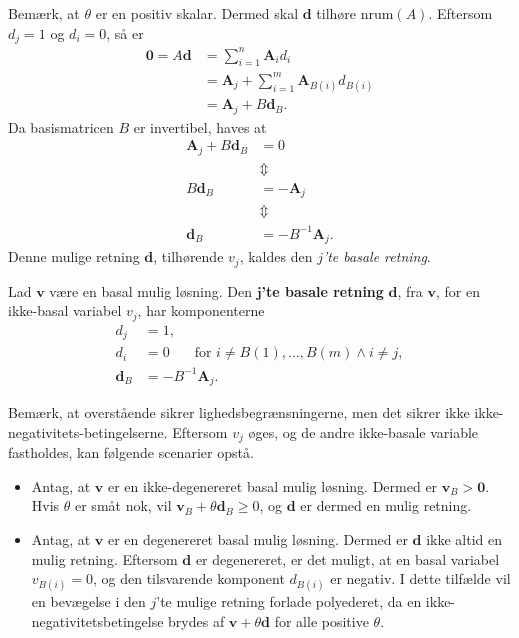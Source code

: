 Bemærk, at $\theta$ er en positiv skalar. 
Dermed skal $\mathbf{d}$ tilhøre $\text{nrum}(A)$.
Eftersom $d_j = 1$ og $d_i = 0$, så er 
%
\begin{align*}
\mathbf{0} = A \mathbf{d} & = \sum^n_{i = 1} \mathbf{A}_i d_i \\
& =  \mathbf{A}_j  + \sum^m_{i = 1} \mathbf{A}_{B(i)} d_{B(i)} \\
& =  \mathbf{A}_j  + B \mathbf{d}_B.
\end{align*}
%
Da basismatricen $B$ er invertibel, haves at
% 
\begin{align*}
\mathbf{A}_j  + B \mathbf{d}_B & = 0 \\
& \Updownarrow \\
B \mathbf{d}_B & = - \mathbf{A}_j \\
& \Updownarrow \\
\mathbf{d}_B & = - B^{-1} \mathbf{A}_j .
\end{align*}
% 
Denne mulige retning $\textbf{d}$, tilhørende $v_j$, kaldes den \textit{$j$'te basale retning}.
% 
\begin{defn}{}{}
Lad $\mathbf{v}$ være en basal mulig løsning. 
Den \textbf{$\textbf{j}$'te basale retning} $\mathbf{d}$, fra $\mathbf{v}$, for en ikke-basal variabel $v_j$, har komponenterne 
%
\begin{align*}
d_j & = 1, \\
d_i & = 0 \phantom{hej} \text{ for } i \neq B(1), \ldots , B(m) \wedge i \neq j, \\
\mathbf{d}_B & = - B^{-1} \mathbf{A}_j.
\end{align*}
% 
\end{defn}
\noindent
%
Bemærk, at overstående sikrer lighedsbegrænsningerne, men det sikrer ikke ikke-negativitets-betingelserne.
Eftersom $v_j$ øges, og de andre ikke-basale variable fastholdes, kan følgende scenarier opstå.
%
\begin{itemize}
\item Antag, at $\mathbf{v}$ er en ikke-degenereret basal mulig løsning. 
Dermed er $\mathbf{v}_B > \mathbf{0}$. 
Hvis $\theta$ er småt nok, vil $\mathbf{v}_B + \theta \mathbf{d}_B \geq 0 $, og $\mathbf{d}$ er dermed en mulig retning. 
\item Antag, at $\mathbf{v}$ er en degenereret basal mulig løsning. 
Dermed er $\mathbf{d}$ ikke altid en mulig retning. 
Eftersom $\mathbf{d}$ er degenereret, er det muligt, at en basal variabel $v_{B(i)}=0$, og den tilsvarende komponent $d_{B(i)}$ er negativ. 
I dette tilfælde vil en bevægelse i den $j$'te mulige retning forlade polyederet, da en ikke-negativitetsbetingelse brydes af $\mathbf{v} + \theta \mathbf{d}$ for alle positive $\theta$.
\end{itemize}
